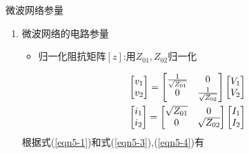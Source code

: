\begin{frame}{微波网络参量}
    \begin{enumerate}
        \item 微波网络的电路参量
              \begin{itemize}
                  \item 归一化阻抗矩阵$[z]$:用$Z_{01},Z_{02}$归一化
              \end{itemize}
              \begin{gather}
                  \begin{bmatrix*}
                      v_1\\
                      v_2\\
                  \end{bmatrix*}
                  =
                  \begin{bmatrix*}
                      \frac{1}{\sqrt{Z_{01}}} & 0\\
                      0 & \frac{1}{\sqrt{Z_{02}}}\\
                  \end{bmatrix*}
                  \begin{bmatrix*}
                      V_1 \\
                      V_2 \\
                  \end{bmatrix*}\label{eqn5-3}\\
                  \hspace*{\fill}
                  \begin{bmatrix*}
                      i_1\\
                      i_2\\
                  \end{bmatrix*}
                  =
                  \begin{bmatrix*}
                      \sqrt{Z_{01}} & 0\\
                      0 & \sqrt{Z_{02}}\\
                  \end{bmatrix*}
                  \begin{bmatrix*}
                      I_1 \\
                      I_2 \\
                  \end{bmatrix*}
                  \label{eqn5-4}
              \end{gather}
              根据式(\ref{eqn5-1})和式(\ref{eqn5-3}),(\ref{eqn5-4})有

\end{enumerate}
\end{frame}
